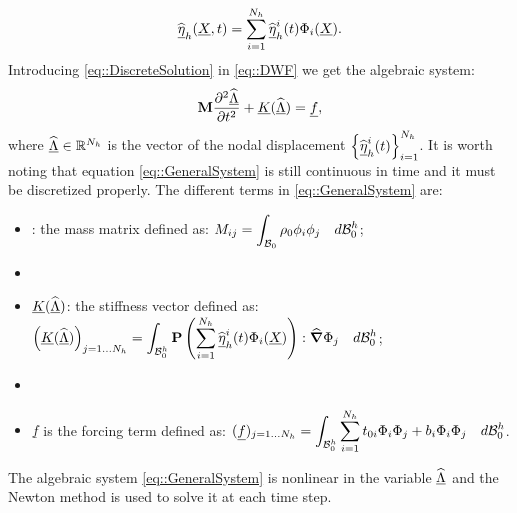 \begin{equation}
  \displaystyle \widehat{\underline{\eta}}_h(\underline{X},t)=
  \sum_{i=1}^{N_h}\widehat{\underline{\eta}}_h^i(t)\Phi_i(\underline{X}).
  \label{eq::DiscreteSolution}
\end{equation}
Introducing \eqref{eq::DiscreteSolution} in
\eqref{eq::DWF} we get the algebraic system:
\begin{equation}
  \textbf{M}\frac{\partial^2\widehat{\underline{\Lambda}}}{\partial t^2}+\underline{K}(\widehat{\underline{\Lambda}})
  = \underline{f},
  \label{eq::GeneralSystem}
\end{equation}
where $\widehat{\underline{\Lambda}} \in \mathbb{R}^{N_h}$ is the vector of the nodal
displacement $\left\{\widehat{\underline{\eta}}_h^i(t)\right\}_{i=1}^{N_h}$. It is worth
noting that equation \eqref{eq::GeneralSystem} is still continuous in
time and it must be discretized properly. The different terms in
\eqref{eq::GeneralSystem} are:
\begin{itemize}
\item \mass: the mass matrix defined as: $\displaystyle
  M_{ij}=\int_{\mathcal{B}_0}\rho_0\phi_i\phi_j\quad d\mathcal{B}_0^h$;
\item[]
\item $\underline{K}(\widehat{\underline{\Lambda}})$: the stiffness vector defined as: $\displaystyle
  \left(\underline{K}(\widehat{\underline{\Lambda}})\right)_{j=1\ldots
    N_h}=\int_{\mathcal{B}_0^h}\textbf{P}\left(\sum_{i=1}^{N_h}\widehat{\underline{\eta}}_h^i(t)
    \Phi_i(\underline{X})\right):\widehat{\boldsymbol{\nabla}}\Phi_j\quad
  d \mathcal{B}_0^h$;
\item[]
\item $\underline{f}$ is the forcing term defined as: $\displaystyle
  (\underline{f})_{j=1\ldots
    N_h}=\int_{\mathcal{B}_0^h}\sum_{i=1}^{N_h}t_{0i}\Phi_i\Phi_j+b_i\Phi_i\Phi_j
    \quad
  d\mathcal{B}_0^h$.
\end{itemize} The algebraic system \eqref{eq::GeneralSystem} is
nonlinear in the variable $\widehat{\underline{\Lambda}}$ and the Newton method is used to
solve it at each time step.

